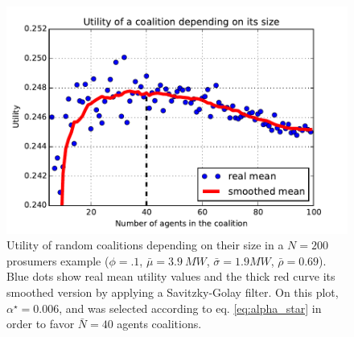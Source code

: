 \documentclass[journal]{IEEEtran}
\begin{document}
\begin{figure}
	\begin{center}
		\includegraphics[scale=.45]{./figs/figure_4}
		\caption{{\footnotesize Utility of random coalitions depending on their size in a $N=200$ prosumers example ($\phi = .1$, $ \bar{\mu}=3.9\ MW $, $\bar{\sigma} = 1.9 MW $, $ \bar{\rho} = 0.69 $). Blue dots show real mean utility values and the thick red curve its smoothed version by applying a Savitzky-Golay filter. On this plot, $ \alpha^{\star} = 0.006 $, and was selected according to eq. \ref{eq:alpha_star} in order to favor $\bar{N} = 40$ agents coalitions.}}
		\label{fig:real_utility2}
	\end{center}
\end{figure}
\end{document}
